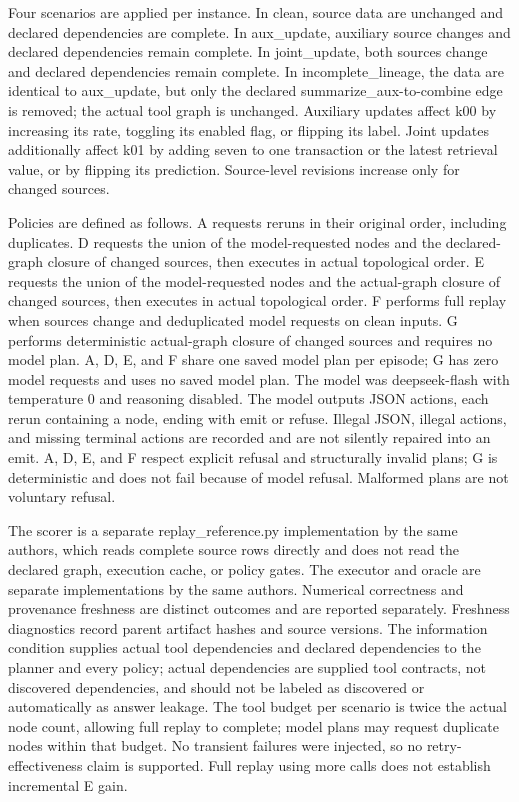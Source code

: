 \documentclass{article}
\begin{document}
Four scenarios are applied per instance. In clean, source data are unchanged and declared dependencies are complete. In aux\_update, auxiliary source changes and declared dependencies remain complete. In joint\_update, both sources change and declared dependencies remain complete. In incomplete\_lineage, the data are identical to aux\_update, but only the declared summarize\_aux-to-combine edge is removed; the actual tool graph is unchanged. Auxiliary updates affect k00 by increasing its rate, toggling its enabled flag, or flipping its label. Joint updates additionally affect k01 by adding seven to one transaction or the latest retrieval value, or by flipping its prediction. Source-level revisions increase only for changed sources.

Policies are defined as follows. A requests reruns in their original order, including duplicates. D requests the union of the model-requested nodes and the declared-graph closure of changed sources, then executes in actual topological order. E requests the union of the model-requested nodes and the actual-graph closure of changed sources, then executes in actual topological order. F performs full replay when sources change and deduplicated model requests on clean inputs. G performs deterministic actual-graph closure of changed sources and requires no model plan. A, D, E, and F share one saved model plan per episode; G has zero model requests and uses no saved model plan. The model was deepseek-flash with temperature 0 and reasoning disabled. The model outputs JSON actions, each rerun containing a node, ending with emit or refuse. Illegal JSON, illegal actions, and missing terminal actions are recorded and are not silently repaired into an emit. A, D, E, and F respect explicit refusal and structurally invalid plans; G is deterministic and does not fail because of model refusal. Malformed plans are not voluntary refusal.

The scorer is a separate replay\_reference.py implementation by the same authors, which reads complete source rows directly and does not read the declared graph, execution cache, or policy gates. The executor and oracle are separate implementations by the same authors. Numerical correctness and provenance freshness are distinct outcomes and are reported separately. Freshness diagnostics record parent artifact hashes and source versions. The information condition supplies actual tool dependencies and declared dependencies to the planner and every policy; actual dependencies are supplied tool contracts, not discovered dependencies, and should not be labeled as discovered or automatically as answer leakage. The tool budget per scenario is twice the actual node count, allowing full replay to complete; model plans may request duplicate nodes within that budget. No transient failures were injected, so no retry-effectiveness claim is supported. Full replay using more calls does not establish incremental E gain.
\end{document}
